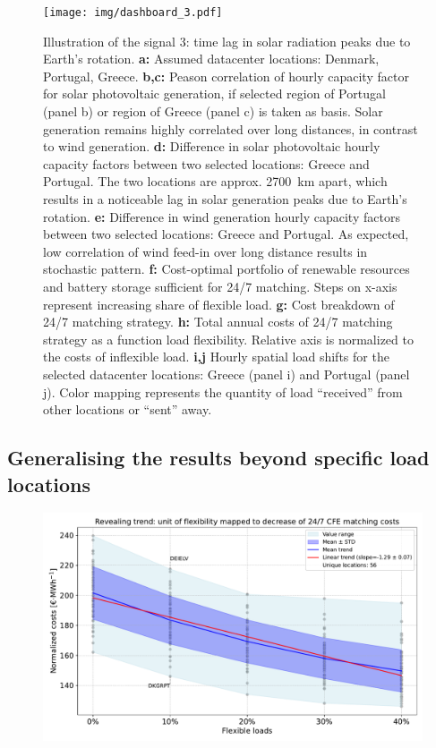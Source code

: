 \begin{figure}
    \centering
    \texttt{[image: img/dashboard\_3.pdf]}
    \caption{Illustration of the signal 3: time lag in solar radiation peaks due to Earth's rotation.
    \textbf{a:} Assumed datacenter locations: Denmark, Portugal, Greece.
    \textbf{b,c:} Peason correlation of hourly capacity factor for solar photovoltaic generation, if selected region of Portugal (panel b) or region of Greece (panel c) is taken as basis. Solar generation remains highly correlated over long distances, in contrast to wind generation.
    \textbf{d:} Difference in solar photovoltaic hourly capacity factors between two selected locations: Greece and Portugal. The two locations are approx. 2700~km apart, which results in a noticeable lag in solar generation peaks due to Earth's rotation.
    \textbf{e:} Difference in wind generation hourly capacity factors between two selected locations: Greece and Portugal. As expected, low correlation of wind feed-in over long distance results in stochastic pattern.
    \textbf{f:} Cost-optimal portfolio of renewable resources and battery storage sufficient for 24/7 matching. Steps on x-axis represent increasing share of flexible load.
    \textbf{g:} Cost breakdown of 24/7 matching strategy.
    \textbf{h:} Total annual costs of 24/7 matching strategy as a function load flexibility. Relative axis is normalized to the costs of inflexible load.
    \textbf{i,j} Hourly spatial load shifts for the selected datacenter locations: Greece (panel i) and Portugal (panel j). Color mapping represents the quantity of load \enquote{received} from other locations or \enquote{sent} away.}
    \label{fig:dashboard3}
\end{figure}

\subsection{Generalising the results beyond specific load locations}

\begin{figure}
    \centering
    \includegraphics[width=1\columnwidth]{img/flexibility_vs_normalized_costs.pdf}
    \caption{\lipsum[1]}
    \label{fig:flexcost}
\end{figure}
